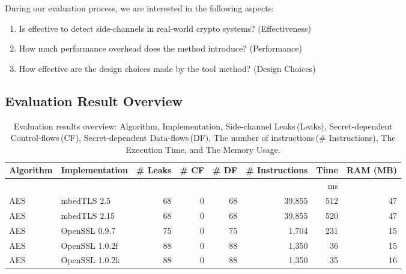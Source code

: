 During our evaluation process, we are interested in the following
aspects:
\begin{enumerate}
    \item Is \tool{} effective to detect side-channels in real-world crypto systems? (Effectiveness)
    \item How much performance overhead does the method introduce? (Performance)
    \item How effective are the design choices made by the tool method? (Design Choices)
\end{enumerate}

\subsection{Evaluation Result Overview}
\begin{table}[]
  \centering\small\footnotesize
  \caption{Evaluation results overview: Algorithm, Implementation, Side-channel Leaks\,(Leaks),
    Secret-dependent Control-flows\,(CF), Secret-dependent Data-flows\,(DF),
    The number of instructions\,(\# Instructions), The Execution Time, and The Memory Usage.
  }\label{table:over_result}
  \begin{tabular}{llrrrrrr}
    \hline
    \textbf{Algorithm} & \textbf{Implementation}  & \textbf{\# Leaks} & \textbf{\# CF}    & \textbf{\# DF}
                       & \textbf{\# Instructions} & \textbf{Time}     & \textbf{RAM (MB)}                                                  \\\hline
                       &                          &                   &                   &                &             & ms              \\\cline{7-7}
    AES                & mbedTLS 2.5              & 68                & 0                 & 68             & 39,855      & 512     & 47    \\
    AES                & mbedTLS 2.15             & 68                & 0                 & 68             & 39,855      & 520     & 47    \\
    AES                & OpenSSL 0.9.7            & 75                & 0                 & 75             & 1,704       & 231     & 15    \\
    AES                & OpenSSL 1.0.2f           & 88                & 0                 & 88             & 1,350       & 36      & 15    \\
    AES                & OpenSSL 1.0.2k           & 88                & 0                 & 88             & 1,350       & 35      & 16    \\

\end{tabular}
\end{table}
